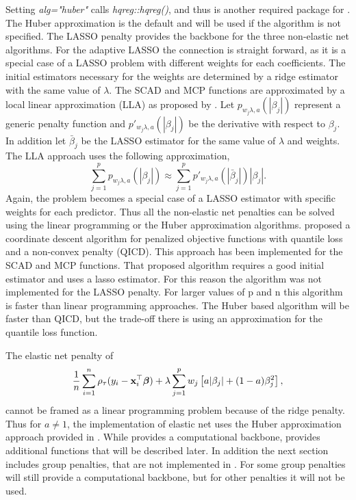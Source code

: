 \documentclass[article]{rqPenVignette}%
\newcommand{\vx}{{\bf x}}
\newcommand{\vbeta}{\mbox{\boldmath $\beta$}}
\begin{document}
Setting \emph{alg="huber"} calls \emph{hqreg::hqreg()}, and thus  is another required package for . The Huber approximation is the default and will be used if the algorithm is not specified.  The LASSO penalty provides the backbone for the three non-elastic net algorithms. For the adaptive LASSO the connection is straight forward, as it is a special case of a LASSO problem with different weights for each coefficients. The initial estimators necessary for the weights are determined by a ridge estimator with the same value of $\lambda$. The SCAD and MCP functions are approximated by a local linear approximation (LLA) as proposed by \citet{lla}. Let $p_{w_j\lambda,a}(|\beta_j|)$ represent a generic penalty function and $p'_{w_j\lambda,a}(|\beta_j|)$ be the derivative with respect to $\beta_j$. In addition let $\bar{\beta}_j$ be the LASSO estimator for the same value of $\lambda$ and weights. The LLA approach uses the following approximation, 
\begin{equation}
\label{lla}
\sum_{j=1}^p p_{w_j\lambda,a}(|\beta_j|) \approx \sum_{j=1}^p p'_{w_j\lambda,a}(|\bar{\beta}_j|)|\beta_j|.
\end{equation}
Again, the problem becomes a special case of a LASSO estimator with specific weights for each predictor. Thus all the non-elastic net penalties can be solved using the linear programming or the Huber approximation algorithms. \citet{qr_cd} proposed a coordinate descent algorithm for penalized objective functions with quantile loss and a non-convex penalty (QICD). This approach has been implemented for the SCAD and MCP functions. That proposed algorithm requires a good initial estimator and  uses a lasso estimator. For this reason the algorithm was not implemented for the LASSO penalty. For larger values of p and n this algorithm is faster than linear programming approaches. The Huber based algorithm will be faster than QICD, but the trade-off there is using an approximation for the quantile loss function. 


The elastic net penalty of 
\begin{equation}
\label{enet}
\frac{1}{n} \sum_{i=1}^n \rho_\tau(y_i - \vx_i^\top\vbeta) + \lambda \sum_{j=1}^p w_j \left[ a|\beta_j|+(1-a)\beta_j^2\right],
\end{equation}
cannot be framed as a linear programming problem because of the ridge penalty. Thus for $a \neq 1$, the  implementation of elastic net uses the Huber approximation approach provided in . While  provides a computational backbone,  provides additional functions that will be described later. In addition the next section includes group penalties, that are not implemented in . For some group penalties  will still provide a computational backbone, but for other penalties it will not be used. 
\end{document}
